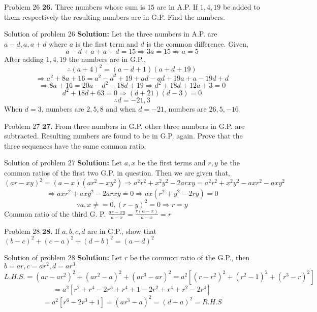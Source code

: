 \documentclass[aspectratio=1610,8pt]{beamer}
\begin{document}
\begin{frame}{Problem 26}
  \textbf{26.} Three numbers whose sum is $15$ are in A.P. If $1, 4, 19$ be
  added to them respectively the resulting numbers are in G.P. Find the
  numbers.
\end{frame}
\begin{frame}{Solution of problem 26}
  \textbf{Solution:} Let the three numbers in A.P. are $a - d, a, a + d$ where
  $a$ is the first term and $d$ is the common difference. Given,
  $$a - d + a + a + d = 15 \Rightarrow 3a = 15 \Rightarrow a = 5$$
  After adding $1, 4, 19$ the numbers are in G.P.,
  $$\therefore (a + 4)^2 = (a - d + 1)(a + d + 19)$$
  $$\Rightarrow a^2 + 8a + 16 = a^2 - d^2 + 19 + ad - ad + 19a + a - 19d + d$$
  $$\Rightarrow 8a + 16 = 20a - d^2 - 18d + 19 \Rightarrow d^2 + 18d + 12a + 3
  = 0$$
  $$d^2 + 18d +63 = 0 \Rightarrow (d + 21)(d - 3) = 0$$
  $$\therefore d = -21, 3$$
  When $d = 3$, numbers are $2, 5, 8$ and when $d = -21$, numbers are $26, 5,
  -16$
\end{frame}
\begin{frame}{Problem 27}
  \textbf{27.} From three numbers in G.P. other three numbers in G.P. are
  subtracted. Resulting numbers are found to be in G.P. again. Prove that the
  three sequences have the same common ratio.
\end{frame}
\begin{frame}{Solution of problem 27}
  \textbf{Solution:} Let $a, x$ be the first terms and $r, y$ be the common
  ratios of the first two G.P. in question. Then we are given that,
  $$(ar - xy)^2 = (a - x)(ar^2 - xy^2) \Rightarrow a^2r^2 + x^2y^2 - 2arxy =
  a^2r^2 + x^2y^2 - axr^2 - axy^2$$
  $$\Rightarrow axr^2 + axy^2 - 2arxy = 0 \Rightarrow ax(r^2 + y^2 - 2ry) = 0$$
  $$\because a, x \neq = 0, (r - y)^2 = 0 \Rightarrow r = y$$
  Common ratio of the third G. P. $\frac{ar - xy}{a - x} = \frac{r(a - x)}{a -
    x} = r$
\end{frame}
\begin{frame}{Problem 28}
  \textbf{28.} If $a, b, c, d$ are in G.P., show that $(b - c)^2 + (c - a)^2 +
  (d - b)^2 = (a - d)^2$
\end{frame}
\begin{frame}{Solution of problem 28}
  \textbf{Solution:} Let $r$ be the common ratio of the G.P., then $b = ar, c =
  ar^2, d= ar^3$
  $$L.H.S. = (ar - ar^2)^2 + (ar^2 - a)^2 + (ar^3 -ar)^2 = a^2[(r - r^2)^2 +
  (r^2 - 1)^2 + (r^3 -r)^2]$$
  $$= a^2[r^2 + r^4 - 2r^3 + r^4 + 1 - 2r^2 + r^4 + r^2 - 2r^4]$$
  $$= a^2[r^6 -2r^3 + 1] = (ar^3 - a)^2 = (d - a)^2 = R.H.S$$
\end{frame}
\end{document}
